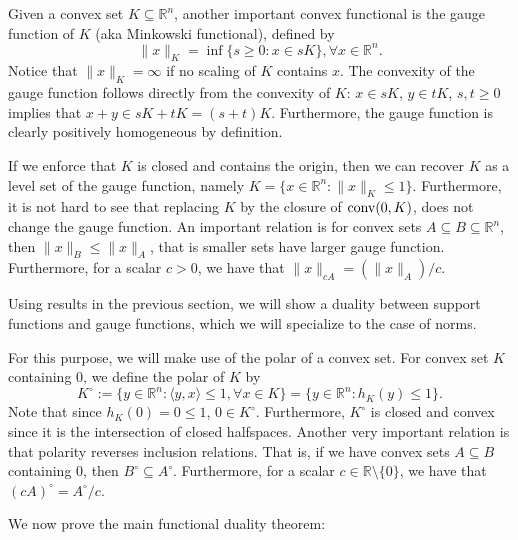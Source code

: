 \documentclass[11pt]{article}
\theoremstyle{plain}
\theoremstyle{plain}
\newcommand{\set}[1]{\{{#1}\}}
\newcommand{\R}{\ensuremath{\mathbb{R}}}
\newcommand{\pr}[2]{\langle{#1, #2}\rangle}
\begin{document}
Given a convex set $K \subseteq \R^n$, another important convex
functional is the gauge function of $K$ (aka Minkowski functional), defined by
\begin{equation}
\label{eq:gauge}
\|x\|_K = \inf \set{s \geq 0: x \in sK}, \forall x \in \R^n.
\end{equation}
Notice that $\|x\|_K = \infty$ if no scaling of $K$ contains $x$.  The convexity
of the gauge function follows directly from the convexity of $K$: $x \in s K$,
$y \in t K$, $s,t \geq 0$ implies that $x + y \in s K + t K = (s+t) K$.
Furthermore, the gauge function is clearly positively homogeneous by definition.

If we enforce that $K$ is closed and contains the origin, then we can recover
$K$ as a level set of the gauge function, namely $K = \set{x \in \R^n: \|x\|_K
\leq 1}$. Furthermore, it is not hard to see that replacing $K$ by the closure
of ${\rm conv}(0,K)$, does not change the gauge function. An important relation
is for convex sets $A \subseteq B \subseteq \R^n$, then $\|x\|_B \leq \|x\|_A$,
that is smaller sets have larger gauge function. Furthermore, for a scalar $c >
0$, we have that $\|x\|_{c A} = (\|x\|_A)/c$.

Using results in the previous section, we will show a duality between support
functions and gauge functions, which we will specialize to the case of norms.

For this purpose, we will make use of the polar of a convex set. For convex set
$K$ containing $0$, we define the polar of $K$ by
\begin{equation}
\label{eq:polar}
K^\circ := \set{y \in \R^n: \pr{y}{x} \leq 1, \forall x \in K}
= \set{y \in \R^n: h_K(y) \leq 1}.
\end{equation}
Note that since $h_K(0) = 0 \leq 1$, $0 \in K^\circ$. Furthermore, $K^\circ$ is
closed and convex since it is the intersection of closed halfspaces. Another
very important relation is that polarity reverses inclusion relations. That is,
if we have convex sets $A \subseteq B$ containing $0$, then $B^\circ \subseteq
A^\circ$. Furthermore, for a scalar $c \in \R \setminus \set{0}$, we have that
$(c A)^\circ = A^\circ/c$.

We now prove the main functional duality theorem:
\end{document}
